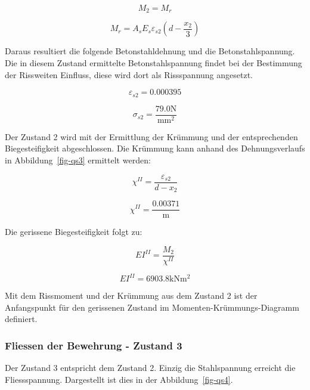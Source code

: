 \documentclass[
  12pt,
  letterpaper,
  egregdoesnotlikesansseriftitles]{scrreprt}
\begin{document}
\begin{equation}M_{2} = M_{r}\end{equation}

\begin{equation}M_{r} = A_{s} E_{s} \varepsilon_{s2} \left(d - \frac{x_{2}}{3}\right)\end{equation}

Daraus resultiert die folgende Betonstahldehnung und die
Betonstahlspannung. Die in diesem Zustand ermittelte Betonstahlspannung
findet bei der Bestimmung der Rissweiten Einfluss, diese wird dort als
Rissspannung angesetzt.

\begin{equation}\varepsilon_{s2} = 0.000395\end{equation}

\begin{equation}\sigma_{s 2} = \frac{79.0 \text{N}}{\text{mm}^{2}}\end{equation}

Der Zustand 2 wird mit der Ermittlung der Krümmung und der
entsprechenden Biegesteifigkeit abgeschlossen. Die Krümmung kann anhand
des Dehnungsverlaufs in Abbildung~\ref{fig-qs3} ermittelt werden:

\begin{equation}\chi^{II} = \frac{\varepsilon_{s2}}{d - x_{2}}\end{equation}

\begin{equation}\chi^{II} = \frac{0.00371}{\text{m}}\end{equation}

Die gerissene Biegesteifigkeit folgt zu:

\begin{equation}EI^{II} = \frac{M_{2}}{\chi^{II}}\end{equation}

\begin{equation}EI^{II} = 6903.8 \text{kN} \text{m}^{2}\end{equation}

Mit dem Rissmoment und der Krümmung aus dem Zustand 2 ist der
Anfangspunkt für den gerissenen Zustand im Momenten-Krümmungs-Diagramm
definiert.

\subsubsection{Fliessen der Bewehrung - Zustand
3}\label{fliessen-der-bewehrung---zustand-3}

Der Zustand 3 entspricht dem Zustand 2. Einzig die Stahlspannung
erreicht die Fliessspannung. Dargestellt ist dies in der
Abbildung~\ref{fig-qs4}.
\end{document}
